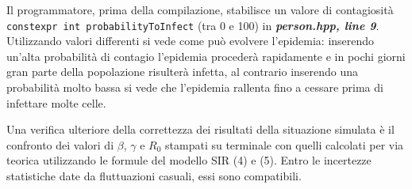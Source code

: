 \documentclass[a4paper,10 pt]{article}
\begin{document}
Il programmatore, prima della compilazione, stabilisce un valore di contagiosità \verb!constexpr int probabilityToInfect! (tra 0 e 100) in \textbf{\textit{person.hpp, line 9}}. Utilizzando valori differenti si vede come può evolvere l'epidemia: inserendo un'alta probabilità di contagio l'epidemia procederà rapidamente e in pochi giorni gran parte della popolazione risulterà infetta, al contrario inserendo una probabilità molto bassa si vede che l'epidemia rallenta fino a cessare prima di infettare molte celle.


Una verifica ulteriore della correttezza dei risultati della situazione simulata è il confronto dei valori di $\beta$, $\gamma$ e $R_0$ stampati su terminale con quelli calcolati per via teorica utilizzando le formule del modello SIR (4) e (5). Entro le incertezze statistiche date da fluttuazioni casuali, essi sono compatibili.

\begin{figure}[h]
\centering
{} \quad {} \\
\caption{}
\label{fig:subfig}
\end{figure}
\end{document}
